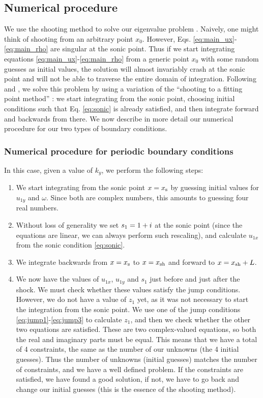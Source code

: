 \documentclass[useAMS,usenatbib]{mn2e}
\begin{document}
\subsection{Numerical procedure}

We use the shooting method to solve our eigenvalue problem \citep[e.g.][]{NR2007}. Naively, one might think of shooting from an arbitrary point $x_0$. However, Eqs. \eqref{eq:main_ux}-\eqref{eq:main_rho} are singular at the sonic point. Thus if we start integrating equations \eqref{eq:main_ux}-\eqref{eq:main_rho} from a generic point $x_0$ with some random guesses as initial values, the solution will almost invariably crash at the sonic point and will not be able to traverse the entire domain of integration. Following \cite{LeeShu2012} and \cite{KimKimKim2014}, we solve this problem by using a variation of the ``shooting to a fitting point method'' \citep[e.g.][]{NR2007}: we start integrating from the sonic point, choosing initial conditions such that Eq. \eqref{eq:sonic} is already satisfied, and then integrate forward and backwards from there. We now describe in more detail our numerical procedure for our two types of boundary conditions.

\subsubsection{Numerical procedure for periodic boundary conditions}
In this case, given a value of $k_y$, we perform the following steps:
\begin{enumerate}
\item We start integrating from the sonic point $x=x_{\rm s}$ by guessing initial values for $u_{1y}$ and $\omega$. Since both are complex numbers, this amounts to guessing four real numbers. 
\item Without loss of generality we set $s_1=1+i$ at the sonic point (since the equations are linear, we can always perform such rescaling), and calculate $u_{1x}$ from the sonic condition \eqref{eq:sonic}.
\item We integrate backwards from $x=x_{\rm s}$ to $x=x_{\rm sh}$ and forward to $x=x_{\rm sh} + L$. 
\item We now have the values of $u_{1x}$, $u_{1y}$ and $s_1$ just before and just after the shock. We must check whether these values satisfy the jump conditions. However, we do not have a value of $z_1$ yet, as it was not necessary to start the integration from the sonic point. We use one of the jump conditions \eqref{eq:jump1}-\eqref{eq:jump3} to calculate $z_1$, and then we check whether the other two equations are satisfied. These are two complex-valued equations, so both the real and imaginary parts must be equal. This means that we have a total of 4 constraints, the same as the number of our unknowns (the 4 initial guesses). Thus the number of unknowns (initial guesses) matches the number of constraints, and we have a well defined problem. If the constraints are satisfied, we have found a good solution, if not, we have to go back and change our initial guesses (this is the essence of the shooting method).
\end{enumerate}
\end{document}
